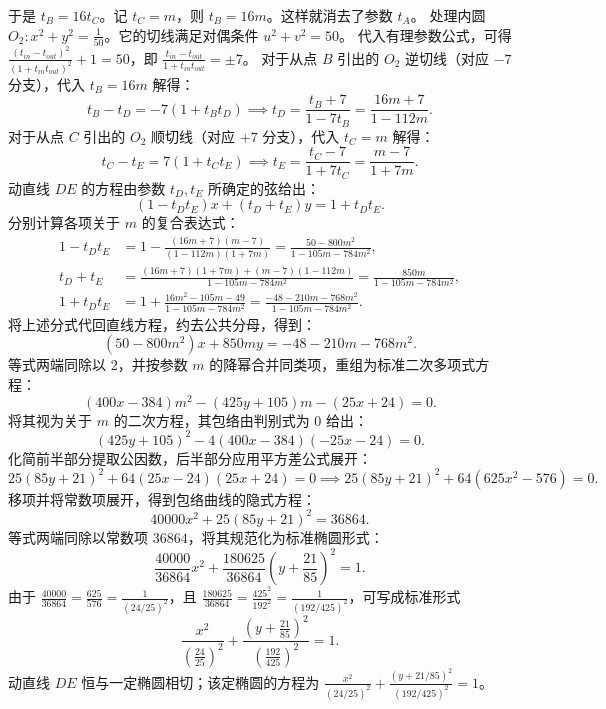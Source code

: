 \begin{solution}
于是 $t_B = 16t_C$。记 $t_C = m$，则 $t_B = 16m$。这样就消去了参数 $t_A$。
处理内圆 $O_2: x^2 + y^2 = \frac{1}{50}$。它的切线满足对偶条件 $u^2 + v^2 = 50$。
代入有理参数公式，可得 $\frac{(t_{in} - t_{out})^2}{(1 + t_{in} t_{out})^2} + 1 = 50$，即 $\frac{t_{in} - t_{out}}{1 + t_{in} t_{out}} = \pm 7$。
对于从点 $B$ 引出的 $O_2$ 逆切线（对应 $-7$ 分支），代入 $t_B = 16m$ 解得：
\[ t_B - t_D = -7(1 + t_B t_D) \implies t_D = \frac{t_B + 7}{1 - 7t_B} = \frac{16m + 7}{1 - 112m}. \]
对于从点 $C$ 引出的 $O_2$ 顺切线（对应 $+7$ 分支），代入 $t_C = m$ 解得：
\[ t_C - t_E = 7(1 + t_C t_E) \implies t_E = \frac{t_C - 7}{1 + 7t_C} = \frac{m - 7}{1 + 7m}. \]
动直线 $DE$ 的方程由参数 $t_D, t_E$ 所确定的弦给出：
\[ (1 - t_D t_E)x + (t_D + t_E)y = 1 + t_D t_E. \]
分别计算各项关于 $m$ 的复合表达式：
\begin{align*}
1 - t_D t_E &= 1 - \frac{(16m + 7)(m - 7)}{(1 - 112m)(1 + 7m)} = \frac{50 - 800m^2}{1 - 105m - 784m^2}, \\
t_D + t_E &= \frac{(16m + 7)(1 + 7m) + (m - 7)(1 - 112m)}{1 - 105m - 784m^2} = \frac{850m}{1 - 105m - 784m^2}, \\
1 + t_D t_E &= 1 + \frac{16m^2 - 105m - 49}{1 - 105m - 784m^2} = \frac{-48 - 210m - 768m^2}{1 - 105m - 784m^2}.
\end{align*}
将上述分式代回直线方程，约去公共分母，得到：
\[ (50 - 800m^2)x + 850my = -48 - 210m - 768m^2. \]
等式两端同除以 $2$，并按参数 $m$ 的降幂合并同类项，重组为标准二次多项式方程：
\[ (400x - 384)m^2 - (425y + 105)m - (25x + 24) = 0. \]
将其视为关于 $m$ 的二次方程，其包络由判别式为 $0$ 给出：
\[ (425y + 105)^2 - 4(400x - 384)(-25x - 24) = 0. \]
化简前半部分提取公因数，后半部分应用平方差公式展开：
\[ 25(85y + 21)^2 + 64(25x - 24)(25x + 24) = 0 \implies 25(85y + 21)^2 + 64(625x^2 - 576) = 0. \]
移项并将常数项展开，得到包络曲线的隐式方程：
\[ 40000x^2 + 25(85y + 21)^2 = 36864. \]
等式两端同除以常数项 $36864$，将其规范化为标准椭圆形式：
\[ \frac{40000}{36864}x^2 + \frac{180625}{36864}\left(y + \frac{21}{85}\right)^2 = 1. \]
由于 $\frac{40000}{36864} = \frac{625}{576} = \frac{1}{(24/25)^2}$，且 $\frac{180625}{36864} = \frac{425^2}{192^2} = \frac{1}{(192/425)^2}$，可写成标准形式
\[ \frac{x^2}{\left(\frac{24}{25}\right)^2} + \frac{\left(y + \frac{21}{85}\right)^2}{\left(\frac{192}{425}\right)^2} = 1. \]
动直线 $DE$ 恒与一定椭圆相切；该定椭圆的方程为 $\frac{x^2}{(24/25)^2} + \frac{\left(y + 21/85\right)^2}{(192/425)^2} = 1$。
\end{solution}



